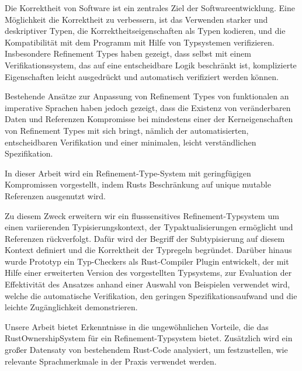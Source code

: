 
\Abstract
Die Korrektheit von Software ist ein zentrales Ziel der Softwareentwicklung.
Eine Möglichkeit die Korrektheit zu verbessern, ist das Verwenden starker und deskriptiver Typen, die Korrektheitseigenschaften als Typen kodieren, und die Kompatibilität mit dem Programm mit Hilfe von Typsystemen verifizieren.
Insbesondere Refinement Types haben gezeigt, dass selbst mit einem Verifikationssystem, das auf eine entscheidbare Logik beschränkt ist, komplizierte Eigenschaften leicht ausgedrückt und automatisch verifiziert werden können.

Bestehende Ansätze zur Anpassung von Refinement Types von funktionalen an imperative Sprachen haben jedoch gezeigt, dass die Existenz von veränderbaren Daten und Referenzen Kompromisse bei mindestens einer der Kerneigenschaften von Refinement Types mit sich bringt, nämlich der automatisierten, entscheidbaren Verifikation und einer minimalen, leicht verständlichen Spezifikation.

In dieser Arbeit wird ein Refinement-Type-System mit geringfügigen Kompromissen vorgestellt, indem Rusts Beschränkung auf unique mutable Referenzen ausgenutzt wird.


Zu diesem Zweck erweitern wir ein flusssensitives Refinement-Typsystem um einen variierenden Typisierungskontext, der Typaktualisierungen ermöglicht und Referenzen rückverfolgt. Dafür wird der Begriff der Subtypisierung auf diesem Kontext definiert und die Korrektheit der Typregeln begründet.
Darüber hinaus wurde Prototyp ein Typ-Checkers als Rust-Compiler Plugin entwickelt, der mit Hilfe einer erweiterten Version des vorgestellten Typsystems, zur Evaluation der Effektivität des Ansatzes anhand einer Auswahl von Beispielen verwendet wird, welche die automatische Verifikation, den geringen Spezifikationsaufwand und die leichte Zugänglichkeit demonstrieren.

Unsere Arbeit bietet Erkenntnisse in die ungewöhnlichen Vorteile, die das Rust\Hyphdash{}Ownership\Hyphdash{}System für ein Refinement-Typsystem bietet. Zusätzlich wird ein großer Datensaty von bestehendem Rust-Code analysiert, um festzustellen, wie relevante Sprachmerkmale in der Praxis verwendet werden.
